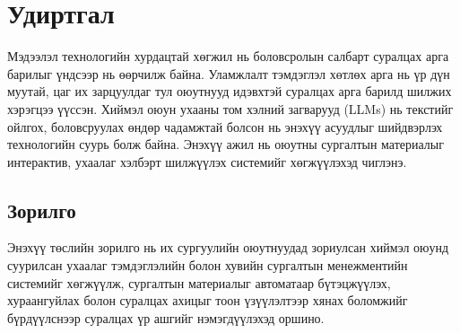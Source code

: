 
{}
\label{Introduction} %
    \section*{Удиртгал}
    Мэдээлэл технологийн хурдацтай хөгжил нь боловсролын салбарт суралцах арга барилыг үндсээр нь өөрчилж байна. Уламжлалт тэмдэглэл хөтлөх арга нь үр дүн муутай, цаг их зарцуулдаг тул оюутнууд идэвхтэй суралцах арга барилд шилжих хэрэгцээ үүссэн. Хиймэл оюун ухааны том хэлний загварууд (LLMs) нь текстийг ойлгох, боловсруулах өндөр чадамжтай болсон нь энэхүү асуудлыг шийдвэрлэх технологийн суурь болж байна. Энэхүү ажил нь оюутны сургалтын материалыг интерактив, ухаалаг хэлбэрт шилжүүлэх системийг хөгжүүлэхэд чиглэнэ.

    \subsection*{Зорилго}
    Энэхүү төслийн зорилго нь их сургуулийн оюутнуудад зориулсан хиймэл оюунд суурилсан ухаалаг тэмдэглэлийн болон хувийн сургалтын менежментийн системийг хөгжүүлж, сургалтын материалыг автоматаар бүтэцжүүлэх, хураангуйлах болон суралцах ахицыг тоон үзүүлэлтээр хянах боломжийг бүрдүүлснээр суралцах үр ашгийг нэмэгдүүлэхэд оршино.
    
